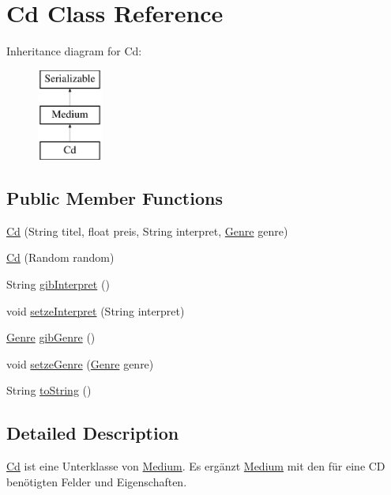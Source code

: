 \hypertarget{classCd}{\section{Cd Class Reference}
\label{classCd}
}
Inheritance diagram for Cd\-:\begin{figure}[H]
\begin{center}
\leavevmode
\includegraphics[height=3.000000cm]{classCd}
\end{center}
\end{figure}
\subsection*{Public Member Functions}
\begin{DoxyCompactItemize}
\item 
\hyperlink{classCd_a35f36899f88a65b28f3d85ccee2270f4}{Cd} (String titel, float preis, String interpret, \hyperlink{enumGenre}{Genre} genre)
\item 
\hyperlink{classCd_a22425fef5f31c3bae54cae2f81911d48}{Cd} (Random random)
\item 
String \hyperlink{classCd_af580a22ffbc326cb02e6c2fe7e7c9e55}{gib\-Interpret} ()
\item 
void \hyperlink{classCd_a4c685bbf10f484f98f61f1d206f99a4b}{setze\-Interpret} (String interpret)
\item 
\hyperlink{enumGenre}{Genre} \hyperlink{classCd_a5705282716e6b787a6d1f6236559df51}{gib\-Genre} ()
\item 
void \hyperlink{classCd_aa042d7c362dad5f4eaeedaaf71f64f5e}{setze\-Genre} (\hyperlink{enumGenre}{Genre} genre)
\item 
String \hyperlink{classCd_a597fea15f5c28cfab25b5d4352da9ab4}{to\-String} ()
\end{DoxyCompactItemize}


\subsection{Detailed Description}
\hyperlink{classCd}{Cd} ist eine Unterklasse von \hyperlink{classMedium}{Medium}. Es ergänzt \hyperlink{classMedium}{Medium} mit den für eine C\-D benötigten Felder und Eigenschaften.

